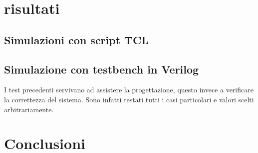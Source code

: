 \documentclass[]{IEEEtran}
\begin{document}
\section{risultati}

\subsection{Simulazioni con script TCL}

\subsection{Simulazione con testbench in Verilog}
I test precedenti servivano ad assistere la progettazione, questo invece a verificare la correttezza del sistema. Sono infatti testati tutti i casi particolari e valori scelti arbitrariamente.














\section{Conclusioni}




\appendix
\end{document}
